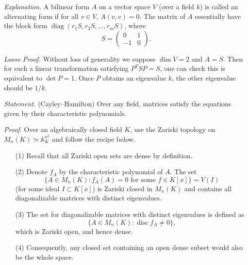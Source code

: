 \documentclass{mathproblems}
\begin{document}
\begin{questions}

\textit{Explanation.} A bilinear form $A$ on a vector space $V$ (over a field $k$) is called an alternating form if for all $v \in V$, $A(v, v)=0$. The matrix of $A$ essentially have the block form $\operatorname{diag}(r_1S,r_2S,\ldots,r_mS)$, where
$$
S=\begin{pmatrix}
0 & 1 \\ -1 & 0
\end{pmatrix}.
$$

\textit{Loose Proof.} Without loss of generality we suppose $\dim V=2$ and $A=S$. Then for such a linear transformation satisfying $P^TSP=S$, one can check this is equivalent to $\det P=1$. Once $P$ obtains an eigenvalue $k$, the other eigenvalue should be $1/k$.



{\color{violet}
\textit{Statement.} (Cayley--Hamilton) Over any field, matrices satisfy the equations given by their characteristic polynomials.}

\textit{Proof.} Over an algebraically closed field $K$, use the Zariski topology on $M_n(K)\simeq \mathbb{A}_K^{n^2}$ and follow the recipe below.
\begin{itemize}
\item[(1)] Recall that all Zariski open sets are dense by definition. 
\item[(2)] Denote $f_A$ by the characteristic polynomial of $A$. The set 
$$
\{A\in M_n(K):f_A(A)=0\text{ for some }f\in K[x]\}=V(I)
$$
(for some ideal $I\subset K[x]$) is Zariski closed in $M_n(K)$ and contains all diagonalizable matrices with distinct eigenvalues.
\item[(3)] The set for diagonalizable matrices with distinct eigenvalues is defined as 
$$
\{A\in M_n(K):\operatorname{disc} f_A\neq 0\},
$$
which is Zariski open, and hence dense. 
\item[(4)] Consequently, any closed set containing an open dense subset would also be the whole space.
\end{itemize}





\end{questions}
\end{document}
